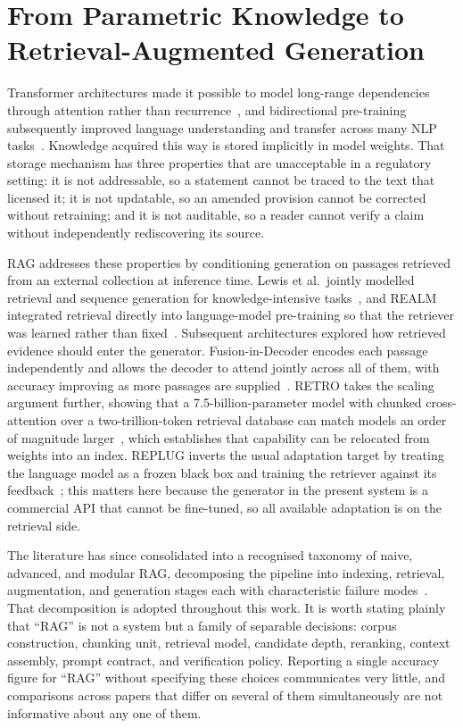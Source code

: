 \section[Retrieval-Augmented Generation]{From Parametric Knowledge to\texorpdfstring{\\}{ }Retrieval-Augmented Generation}
\label{sec:sota-rag}

Transformer architectures made it possible to model long-range dependencies through attention rather than recurrence~\cite{vaswani2017attention}, and bidirectional pre-training subsequently improved language understanding and transfer across many \ac{NLP} tasks~\cite{devlin2019bert}. Knowledge acquired this way is stored implicitly in model weights. That storage mechanism has three properties that are unacceptable in a regulatory setting: it is not addressable, so a statement cannot be traced to the text that licensed it; it is not updatable, so an amended provision cannot be corrected without retraining; and it is not auditable, so a reader cannot verify a claim without independently rediscovering its source.

\ac{RAG} addresses these properties by conditioning generation on passages retrieved from an external collection at inference time. Lewis et al.\ jointly modelled retrieval and sequence generation for knowledge-intensive tasks~\cite{lewis2020rag}, and REALM integrated retrieval directly into language-model pre-training so that the retriever was learned rather than fixed~\cite{guu2020realm}. Subsequent architectures explored how retrieved evidence should enter the generator. Fusion-in-Decoder encodes each passage independently and allows the decoder to attend jointly across all of them, with accuracy improving as more passages are supplied~\cite{izacard2021fid}. RETRO takes the scaling argument further, showing that a 7.5-billion-parameter model with chunked cross-attention over a two-trillion-token retrieval database can match models an order of magnitude larger~\cite{borgeaud2022retro}, which establishes that capability can be relocated from weights into an index. REPLUG inverts the usual adaptation target by treating the language model as a frozen black box and training the retriever against its feedback~\cite{shi2024replug}; this matters here because the generator in the present system is a commercial \ac{API} that cannot be fine-tuned, so all available adaptation is on the retrieval side.

The literature has since consolidated into a recognised taxonomy of naive, advanced, and modular \ac{RAG}, decomposing the pipeline into indexing, retrieval, augmentation, and generation stages each with characteristic failure modes~\cite{gao2023ragsurvey}. That decomposition is adopted throughout this work. It is worth stating plainly that ``\ac{RAG}'' is not a system but a family of separable decisions: corpus construction, chunking unit, retrieval model, candidate depth, reranking, context assembly, prompt contract, and verification policy. Reporting a single accuracy figure for ``\ac{RAG}'' without specifying these choices communicates very little, and comparisons across papers that differ on several of them simultaneously are not informative about any one of them.

